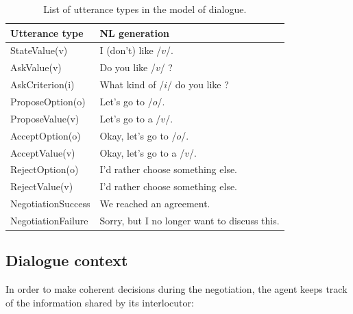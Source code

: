 \documentclass[runningheads,a4paper]{llncs}
\begin{document}
	
	\begin{table}[t]
		
			\begin{tabular} {|p{4.5cm}|p{6cm}|}
				\hline
				\textbf{Utterance type}  &\textbf{ NL generation} \\
				\hline
				StateValue(v) &  I (don't) like /$v$/. \\
				\hline
				AskValue(v)& Do you like /$v$/ ? \\
				
				AskCriterion(i) &  What kind of /$i$/ do you like ? \\
				\hline
				ProposeOption(o)  & Let's go to /$o$/.\\
				
				ProposeValue(v) & Let's go to a /$v$/.\\
				\hline
				AcceptOption(o)& Okay, let's go to /$o$/.\\
				
				AcceptValue(v) & Okay, let's go to a /$v$/.\\
				\hline
				RejectOption(o) & I'd rather choose  something else.\\
				
				RejectValue(v) &  I'd rather choose  something else.\\
				\hline
				NegotiationSuccess &  We reached an agreement.\\
				\cline{1-2}
				NegotiationFailure &  Sorry, but I no longer want to discuss this.\\
				\hline
			\end{tabular}
		
		\caption{\label{table:utt}List of utterance types in the model of dialogue.}
	\end{table}
	
	
	\subsection{Dialogue context}
	In order to make coherent decisions during the negotiation, the agent keeps track of the information shared by its interlocutor:
\end{document}
